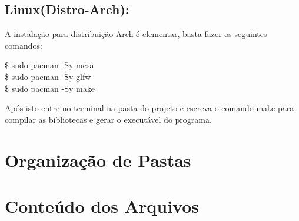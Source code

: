 \documentclass[14pt, letterpaper]{article}
\newcommand\tab[1][1cm]{\hspace*{#1}}
\begin{document}
\subsection{Linux(Distro-Arch):}
\tab A instalação para distribuição Arch é elementar, basta fazer os seguintes comandos: 
\begin{center}
  \$ sudo pacman -Sy mesa \\
  \$ sudo pacman -Sy glfw \\
  \$ sudo pacman -Sy make 
\end{center}
\tab Após isto entre no terminal na pasta do projeto e escreva o comando make para compilar 
as bibliotecas e gerar o executável do programa. 

\section{Organização de Pastas}

\section{Conteúdo dos Arquivos}

\begin{spacing}{2.5}
\end{spacing}
\end{document}
